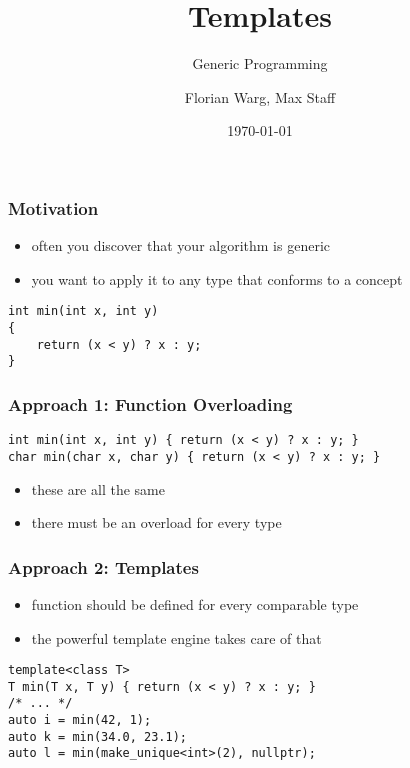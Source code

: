 



\title{Templates}
\subtitle{Generic Programming}
\date{\today}
\author{Florian Warg, Max Staff}

\maketitle

\begin{frame}[fragile]
    \frametitle{Motivation}
    \begin{itemize}
        \item often you discover that your algorithm is generic
        \item you want to apply it to any type that conforms to a concept
    \end{itemize}
    \begin{lstlisting}[numbers=none]
int min(int x, int y)
{
    return (x < y) ? x : y;
}
    \end{lstlisting}
\end{frame}

\begin{frame}[fragile]
    \frametitle{Approach 1: Function Overloading}
    \begin{lstlisting}[numbers=none]
int min(int x, int y) { return (x < y) ? x : y; }
char min(char x, char y) { return (x < y) ? x : y; }
    \end{lstlisting}
    \begin{itemize}
        \item these are all the same
        \item there must be an overload for every type
    \end{itemize}
\end{frame}

\begin{frame}[fragile]
    \frametitle{Approach 2: Templates}
    \begin{itemize}
		\item function should be defined for every comparable type
		\item the powerful template engine takes care of that
    \end{itemize}
    \begin{lstlisting}[numbers=none]
template<class T>
T min(T x, T y) { return (x < y) ? x : y; }
/* ... */
auto i = min(42, 1);
auto k = min(34.0, 23.1);
auto l = min(make_unique<int>(2), nullptr);
    \end{lstlisting}
\end{frame}

